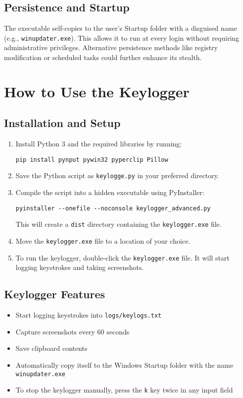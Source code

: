 \subsection{Persistence and Startup}
The executable self-copies to the user's Startup folder with a disguised name (e.g., \texttt{winupdater.exe}). This allows it to run at every login without requiring administrative privileges. Alternative persistence methods like registry modification or scheduled tasks could further enhance its stealth.

\section{How to Use the Keylogger}

\subsection{Installation and Setup}
\begin{enumerate}
    \item Install Python 3 and the required libraries by running:
    \begin{verbatim}
pip install pynput pywin32 pyperclip Pillow
    \end{verbatim}

    \item Save the Python script as \texttt{keylogge.py} in your preferred directory.

    \item Compile the script into a hidden executable using PyInstaller:
    \begin{verbatim}
pyinstaller --onefile --noconsole keylogger_advanced.py
    \end{verbatim}
    This will create a \texttt{dist} directory containing the \texttt{keylogger.exe} file.

    \item Move the \texttt{keylogger.exe} file to a location of your choice.

    \item To run the keylogger, double-click the \texttt{keylogger.exe} file. It will start logging keystrokes and taking screenshots.
\end{enumerate}

\subsection{Keylogger Features}
\begin{itemize}
    \item Start logging keystrokes into \texttt{logs/keylogs.txt}
    \item Capture screenshots every 60 seconds
    \item Save clipboard contents
    \item Automatically copy itself to the Windows Startup folder with the name \texttt{winupdater.exe}
    \item To stop the keylogger manually, press the \texttt{k} key twice in any input field
\end{itemize}

